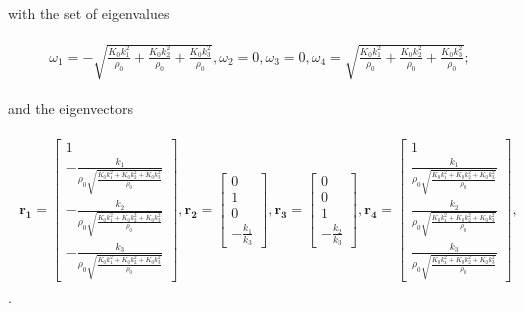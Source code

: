 with the set of eigenvalues

\begin{align}
    \begin{split}
        \omega_1 = -\sqrt{\frac{K_{0} k_{1}^{2}}{\rho_{0}} + \frac{K_{0} k_{2}^{2}}{\rho_{0}} + \frac{K_{0} k_{3}^{2}}{\rho_{0}}},
        \omega_2 = 0,
        \omega_3 = 0,
        \omega_4 = \sqrt{\frac{K_{0} k_{1}^{2}}{\rho_{0}} + \frac{K_{0} k_{2}^{2}}{\rho_{0}} + \frac{K_{0} k_{3}^{2}}{\rho_{0}}};
    \end{split}
\end{align}

and the eigenvectors

\begin{align}
    \begin{split}
    \mathbf{r_1} = \begin{bmatrix}
        1 \\
-\frac{k_{1}}{\rho_{0} \sqrt{\frac{K_{0} k_{1}^{2} + K_{0} k_{2}^{2} + K_{0} k_{3}^{2}}{\rho_{0}}}} \\
-\frac{k_{2}}{\rho_{0} \sqrt{\frac{K_{0} k_{1}^{2} + K_{0} k_{2}^{2} + K_{0} k_{3}^{2}}{\rho_{0}}}} \\
-\frac{k_{3}}{\rho_{0} \sqrt{\frac{K_{0} k_{1}^{2} + K_{0} k_{2}^{2} + K_{0} k_{3}^{2}}{\rho_{0}}}}
        \end{bmatrix},
        \mathbf{r_2} = \begin{bmatrix}
            0 \\
1 \\
0 \\
-\frac{k_{1}}{k_{3}}
            \end{bmatrix},
            \mathbf{r_3} = \begin{bmatrix}
                0 \\
                0 \\
                1 \\
                -\frac{k_{2}}{k_{3}}
                \end{bmatrix},
                \mathbf{r_4} = \begin{bmatrix}
                    1 \\
\frac{k_{1}}{\rho_{0} \sqrt{\frac{K_{0} k_{1}^{2} + K_{0} k_{2}^{2} + K_{0} k_{3}^{2}}{\rho_{0}}}} \\
\frac{k_{2}}{\rho_{0} \sqrt{\frac{K_{0} k_{1}^{2} + K_{0} k_{2}^{2} + K_{0} k_{3}^{2}}{\rho_{0}}}} \\
\frac{k_{3}}{\rho_{0} \sqrt{\frac{K_{0} k_{1}^{2} + K_{0} k_{2}^{2} + K_{0} k_{3}^{2}}{\rho_{0}}}}
                    \end{bmatrix},
    \end{split}
\end{align} .

